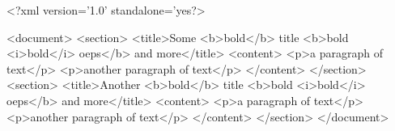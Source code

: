 <?xml version='1.0' standalone='yes?>

<document>
  <section>
    <title>Some <b>bold</b> title <b>bold <i>bold</i> oeps</b> and more</title>
    <content>
      <p>a paragraph of text</p>
      <p>another paragraph of text</p>
    </content>
  </section>
  <section>
    <title>Another <b>bold</b> title <b>bold <i>bold</i> oeps</b> and more</title>
    <content>
      <p>a paragraph of text</p>
      <p>another paragraph of text</p>
    </content>
  </section>
</document>
